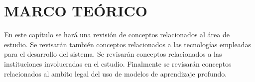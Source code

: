 \chapter{MARCO TEÓRICO}

En este capítulo se hará una revisión de conceptos relacionados al área de 
estudio. Se revisarán también conceptos relacionados a las tecnologías empleadas 
para el desarrollo del sistema. Se revisarán conceptos relacionados a las 
instituciones involucradas en el estudio. Finalmente se revisarán conceptos 
relacionados al ambito legal del uso de modelos de aprendizaje profundo.











